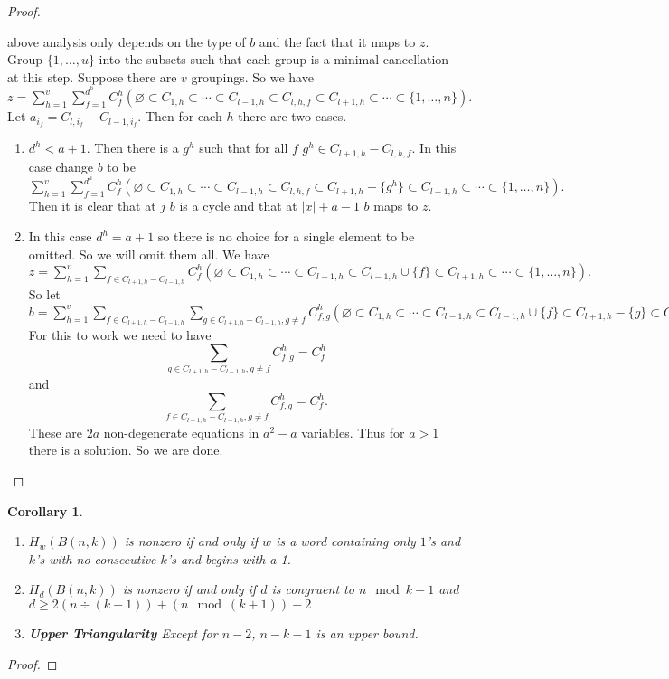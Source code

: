 \documentclass{amsart}
\newtheorem{corollary}[theorem]{Corollary}
\begin{document}
\begin{proof}
\begin{enumerate}
        above analysis only depends on the type of $b$ and the fact that it maps to $z$. 
        Group $\{1, \ldots, u
        \}$ into the subsets such that each group is a minimal cancellation at this step. Suppose there are $v$ groupings. 
        So we have
	  $z = \sum_{h=1}^v \sum_{f=1}^{d^h} C^h_f (\varnothing \subset C_{1, h} \subset \cdots \subset C_{l-1, h} \subset
	  C_{l, h, f} \subset C_{l+1, h} \subset \cdots \subset \{1, \ldots, n\}).$ Let $a_{i_f} = 
	  C_{l, i_f} - C_{l-1, i_f}$. Then for each $h$ there are two cases.
	  \begin{enumerate}
 	  \item $d^h < a+1$. Then there is a $g^h$ such that for all $f$ $g^h \in C_{l+1, h} - C_{l, h, f}$. In this case 
	    change
	    $b$ to be $\sum_{h=1}^v \sum_{f=1}^{d^h} C^h_f (\varnothing \subset C_{1, h} \subset \cdots \subset C_{l-1, h} 
	    \subset C_{l, h, f} \subset C_{l+1, h} - \{g^h\} \subset C_{l+1, h} \subset \cdots \subset \{1, \ldots, n\}).$ 
	    Then it is clear that at $j$ $b$ is a cycle and that at $|x|+a-1$ $b$ maps to $z$. 
 	  \item In this case $d^h = a+1$ so there is no choice for a single element to be omitted. So we will omit them all.
	    We have 
	    $z = \sum_{h=1}^v \sum_{f \in C_{l+1, h} - C_{l-1, h}} C^h_f (\varnothing \subset C_{1, h} \subset \cdots 
	    \subset C_{l-1, h} \subset
	    C_{l-1, h} \cup \{f\} \subset C_{l+1, h} \subset \cdots \subset \{1, \ldots, n\}).$ So let 
          $b = \sum_{h=1}^v \sum_{f \in C_{l+1, h} - C_{l-1, h}} \sum_{g \in C_{l+1, h} - C_{l-1, h}, g \ne f}
          C^h_{f, g} (\varnothing \subset C_{1, h} \subset \cdots 
	    \subset C_{l-1, h} \subset
	    C_{l-1, h} \cup \{f\} \subset C_{l+1, h} - \{g\}\subset C_{l+1, h} \subset \cdots \subset \{1, \ldots, n\}).$ For 
	    this to work we need to have $$\sum_{g \in C_{l+1, h} - C_{l-1, h}, g \ne f} C^h_{f, g} = C^h_f$$ and 
	    $$\sum_{f \in C_{l+1, h} - C_{l-1, h}, g \ne f} C^h_{f, g} = C^h_f.$$ These are $2a$ non-degenerate equations in 
	    $a^2-a$ variables. Thus for $a>1$ there is a solution. So we are done.

	  \end{enumerate}   
    \end{enumerate}
  \end{proof}

  \begin{corollary}


    \begin{enumerate}
      \item $H_w(B(n, k))$ is nonzero if and only if $w$ is a word containing only $1$'s and $k$'s with 
        no consecutive $k$'s and begins with a 1.
      \item $H_d(B(n, k))$ is nonzero if and only if $d$ is congruent to $n \mod k-1$ and $d \ge 2(n \div (k+1)) + (n \mod
        (k+1)) - 2$
      \item {\bf Upper Triangularity} Except for $n-2$, $n-k-1$ is an upper bound.
    \end{enumerate}
  \end{corollary}
  \begin{proof}
  \end{proof}  
\end{document}
